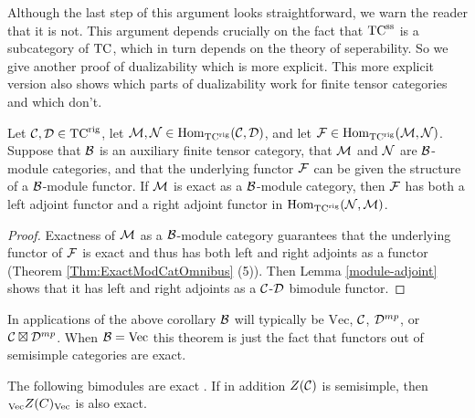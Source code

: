 \documentclass{amsart}
\begin{document}
\begin{warning}
Although the last step of this argument looks straightforward, we warn the reader that it is not.  This argument depends crucially on the fact that $\TCss$ is a subcategory of $\TC$, which in turn depends on the theory of seperability.  So we give another proof of dualizability which is more explicit.  This more explicit version also shows which parts of dualizability work for finite tensor categories and which don't.
\end{warning}


\begin{lemma} \label{lma:2morAdjunction}
Let $\cC, \cD \in \TCrig$, let $\cM, \cN \in \Hom_\TCrig(\cC,\cD)$, and let $\cF \in \Hom_{\TCrig}(\cM,\cN)$.  Suppose that $\cB$ is an auxiliary finite tensor category, that $\cM$ and $\cN$ are $\cB$-module categories, and that the underlying functor $\cF$ can be given the structure of a $\cB$-module functor.  If $\cM$ is exact as a $\cB$-module category, then $\cF$ has both a left adjoint functor and a right adjoint functor in $\Hom_{\TCrig}(\cN,\cM)$.  
\end{lemma}
\begin{proof}
Exactness of $\cM$ as a $\cB$-module category guarantees that the underlying functor of $\cF$ is exact and thus has both left and right adjoints as a functor (Theorem \ref{Thm:ExactModCatOmnibus} (5)).  Then Lemma \ref{module-adjoint} shows that it has left and right adjoints as a $\cC$-$\cD$ bimodule functor.
\end{proof}

\begin{remark}
In applications of the above corollary $\cB$ will typically be $\mathrm{Vec}$, $\cC$, $\cD^{mp}$, or $\cC \boxtimes \cD^{mp}$.  When $\cB = \Vec$ this theorem is just the fact that functors out of semisimple categories are exact.
\end{remark}


\begin{lemma}
The following bimodules are exact .  If in addition $Z(\cC)$ is semisimple, then ${}_\Vec Z(C)_\Vec$ is also exact.
\end{lemma}
\end{document}
